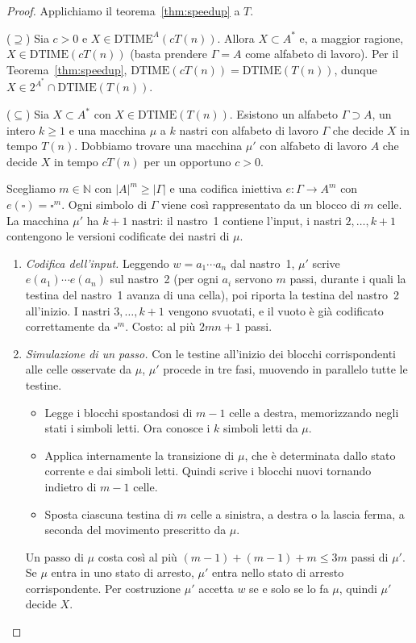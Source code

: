\begin{proof}
Applichiamo 
il teorema~\ref{thm:speedup} 
a $T$.

\smallskip
\noindent($\supseteq$) Sia $c>0$ e $X\in\mathrm{DTIME}^A(cT(n))$. Allora $X\subset A^*$ e, a maggior
ragione, $X\in\mathrm{DTIME}(cT(n))$ (basta prendere $\Gamma=A$ come alfabeto di lavoro).
Per il Teorema~\ref{thm:speedup}, $\mathrm{DTIME}(cT(n))=\mathrm{DTIME}(T(n))$, dunque
$X\in 2^{A^*}\cap\mathrm{DTIME}(T(n))$.

\smallskip
\noindent($\subseteq$) Sia $X\subset A^*$ con $X\in\mathrm{DTIME}(T(n))$. Esistono un alfabeto
$\Gamma\supset A$, un intero $k\ge1$ e una macchina $\mu$ a $k$ nastri con alfabeto di lavoro
$\Gamma$ che decide $X$ in tempo $T(n)$. Dobbiamo trovare una macchina $\mu'$ con alfabeto di
lavoro $A$ che decide $X$ in tempo $cT(n)$ per un opportuno $c>0$.

Scegliamo $m\in\mathbb{N}$ con $|A|^m\ge|\Gamma|$ e una codifica iniettiva
$e\colon\Gamma\to A^m$ con $e(\square)=\square^m$. Ogni simbolo di $\Gamma$ viene così
rappresentato da un blocco di $m$ celle. La macchina $\mu'$ ha $k+1$ nastri: il nastro~1 contiene
l'input, i nastri $2,\dots,k+1$ contengono le versioni codificate dei nastri di $\mu$.

\begin{enumerate}
    \item[1.] \emph{Codifica dell'input.} Leggendo $w=a_1\cdots a_n$ dal nastro~1, $\mu'$ scrive
    $e(a_1)\cdots e(a_n)$ sul nastro~2 (per ogni $a_i$ servono $m$ passi, durante i quali la testina
    del nastro~1 avanza di una cella), poi riporta la testina del nastro~2 all'inizio. I nastri
    $3,\dots,k+1$ vengono svuotati, e il vuoto è già codificato correttamente da $\square^m$.
    Costo: al più $2mn+1$ passi.

    \item[2.] \emph{Simulazione di un passo.} Con le testine all'inizio dei blocchi corrispondenti
    alle celle osservate da $\mu$, $\mu'$ procede in tre fasi, muovendo in parallelo tutte le testine.
    \begin{itemize}
        \item Legge i blocchi spostandosi di $m-1$ celle a destra, memorizzando negli stati i
        simboli letti. Ora conosce i $k$ simboli letti da $\mu$.
        \item Applica internamente la transizione di $\mu$, che è determinata dallo stato corrente
        e dai simboli letti. Quindi scrive i blocchi nuovi tornando indietro di $m-1$ celle.
        \item Sposta ciascuna testina di $m$ celle a sinistra, a destra o la lascia ferma, a seconda
        del movimento prescritto da $\mu$.
    \end{itemize}
    Un passo di $\mu$ costa così al più $(m-1)+(m-1)+m\le 3m$ passi di $\mu'$. Se $\mu$ entra in
    uno stato di arresto, $\mu'$ entra nello stato di arresto corrispondente. Per costruzione
    $\mu'$ accetta $w$ se e solo se lo fa $\mu$, quindi $\mu'$ decide $X$.


\end{enumerate}
\end{proof}
